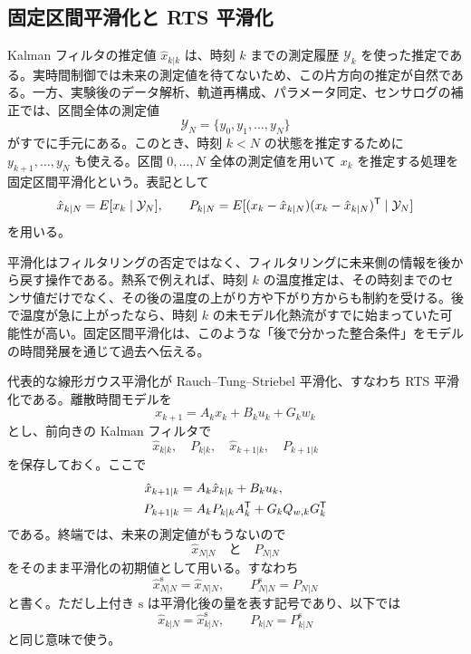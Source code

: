 \subsection{固定区間平滑化と RTS 平滑化}

Kalman フィルタの推定値 $\hat{x}_{k|k}$ は、時刻 $k$ までの測定履歴 $\mathcal{Y}_k$ を使った推定である。実時間制御では未来の測定値を待てないため、この片方向の推定が自然である。一方、実験後のデータ解析、軌道再構成、パラメータ同定、センサログの補正では、区間全体の測定値
\begin{equation}
  \mathcal{Y}_N=\{y_0,y_1,\ldots,y_N\}
\end{equation}
がすでに手元にある。このとき、時刻 $k<N$ の状態を推定するために $y_{k+1},\ldots,y_N$ も使える。区間 $0,\ldots,N$ 全体の測定値を用いて $x_k$ を推定する処理を固定区間平滑化という。表記として
\begin{equation}
  \hat{x}_{k|N}=E[x_k\mid\mathcal{Y}_N],
  \qquad
  P_{k|N}=E[(x_k-\hat{x}_{k|N})(x_k-\hat{x}_{k|N})^{\mathsf{T}}\mid\mathcal{Y}_N]
\end{equation}
を用いる。

平滑化はフィルタリングの否定ではなく、フィルタリングに未来側の情報を後から戻す操作である。熱系で例えれば、時刻 $k$ の温度推定は、その時刻までのセンサ値だけでなく、その後の温度の上がり方や下がり方からも制約を受ける。後で温度が急に上がったなら、時刻 $k$ の未モデル化熱流がすでに始まっていた可能性が高い。固定区間平滑化は、このような「後で分かった整合条件」をモデルの時間発展を通じて過去へ伝える。

代表的な線形ガウス平滑化が Rauch--Tung--Striebel 平滑化、すなわち RTS 平滑化である。離散時間モデルを
\begin{equation}
  x_{k+1}=A_kx_k+B_ku_k+G_kw_k
\end{equation}
とし、前向きの Kalman フィルタで
\begin{equation}
  \hat{x}_{k|k},
  \quad
  P_{k|k},
  \quad
  \hat{x}_{k+1|k},
  \quad
  P_{k+1|k}
\end{equation}
を保存しておく。ここで
\begin{align}
  \hat{x}_{k+1|k}
  &=A_k\hat{x}_{k|k}+B_ku_k,\\
  P_{k+1|k}
  &=A_kP_{k|k}A_k^{\mathsf{T}}+G_kQ_{w,k}G_k^{\mathsf{T}}
\end{align}
である。終端では、未来の測定値がもうないので
\begin{equation}
  \hat{x}_{N|N}
  \quad\text{と}\quad
  P_{N|N}
\end{equation}
をそのまま平滑化の初期値として用いる。すなわち
\begin{equation}
  \hat{x}_{N|N}^{\mathrm{s}}=\hat{x}_{N|N},
  \qquad
  P_{N|N}^{\mathrm{s}}=P_{N|N}
\end{equation}
と書く。ただし上付き $\mathrm{s}$ は平滑化後の量を表す記号であり、以下では
\begin{equation}
  \hat{x}_{k|N}=\hat{x}_{k|N}^{\mathrm{s}},
  \qquad
  P_{k|N}=P_{k|N}^{\mathrm{s}}
\end{equation}
と同じ意味で使う。

